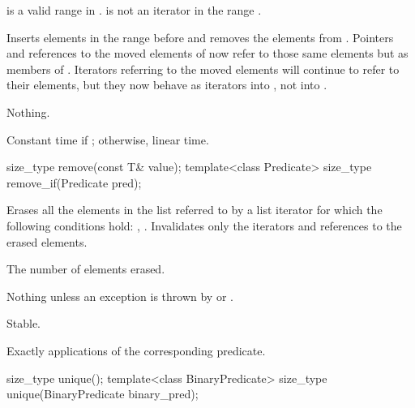 \begin{itemdescr}
\pnum
\expects
\tcode{[first, last)} is a valid range in .
 is not an iterator in the range .

\pnum
\effects
Inserts elements in the range
before
and removes the elements from
.
Pointers and references to the moved elements of
now refer to those same elements but as members of
.
Iterators referring to the moved elements will continue to refer to their
elements, but they now behave as iterators into
,
not into
.

\pnum
\throws
Nothing.

\pnum
\complexity
Constant time if
;
otherwise, linear time.
\end{itemdescr}

%
\begin{itemdecl}
size_type remove(const T& value);
template<class Predicate> size_type remove_if(Predicate pred);
\end{itemdecl}

\begin{itemdescr}
\pnum
\effects
Erases all the elements in the list referred to by a list iterator  for which the
following conditions hold: , .
Invalidates only the iterators and references to the erased elements.

\pnum
\returns
The number of elements erased.

\pnum
\throws
Nothing unless an exception is thrown by
or
.

\pnum
\remarks
Stable.

\pnum
\complexity
Exactly
applications of the corresponding predicate.
\end{itemdescr}

%
\begin{itemdecl}
size_type unique();
template<class BinaryPredicate> size_type unique(BinaryPredicate binary_pred);
\end{itemdecl}

